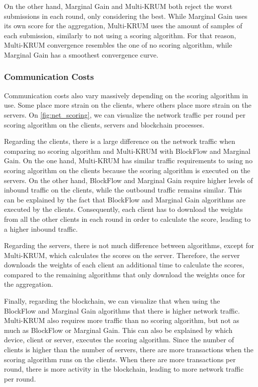 On the other hand, Marginal Gain and Multi-KRUM both reject the worst submissions in each round, only considering the best. While Marginal Gain uses its own score for the aggregation, Multi-KRUM uses the amount of samples of each submission, similarly to not using a scoring algorithm. For that reason, Multi-KRUM convergence resembles the one of no scoring algorithm, while Marginal Gain has a smoothest convergence curve.

\subsubsection{Communication Costs}

Communication costs also vary massively depending on the scoring algorithm in use. Some place more strain on the clients, where others place more strain on the servers. On \autoref{fig:net_scoring}, we can visualize the network traffic per round per scoring algorithm on the clients, servers and blockchain processes.

Regarding the clients, there is a large difference on the network traffic when comparing no scoring algorithm and Multi-KRUM with BlockFlow and Marginal Gain. On the one hand, Multi-KRUM has similar traffic requirements to using no scoring algorithm on the clients because the scoring algorithm is executed on the servers. On the other hand, BlockFlow and Marginal Gain require higher levels of inbound traffic on the clients, while the outbound traffic remains similar. This can be explained by the fact that BlockFlow and Marginal Gain algorithms are executed by the clients. Consequently, each client has to download the weights from all the other clients in each round in order to calculate the score, leading to a higher inbound traffic.

Regarding the servers, there is not much difference between algorithms, except for Multi-KRUM, which calculates the scores on the server. Therefore, the server downloads the weights of each client an additional time to calculate the scores, compared to the remaining algorithms that only download the weights once for the aggregation.

Finally, regarding the blockchain, we can visualize that when using the BlockFlow and Marginal Gain algorithms that there is higher network traffic. Multi-KRUM also requires more traffic than no scoring algorithm, but not as much as BlockFlow or Marginal Gain. This can also be explained by which device, client or server, executes the scoring algorithm. Since the number of clients is higher than the number of servers, there are more transactions when the scoring algorithm runs on the clients. When there are more transactions per round, there is more activity in the blockchain, leading to more network traffic per round.


